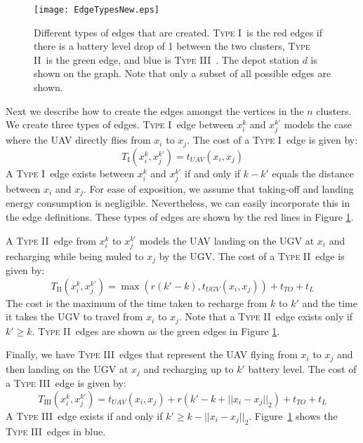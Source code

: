 \documentclass[letterpaper,10pt,conference]{ieeeconf}
\newcommand{\typeone}{\textsc{Type I\ }}
\newcommand{\typetwo}{\textsc{Type II\ }}
\newcommand{\typethree}{\textsc{Type III\ }}
\begin{document}
\begin{figure}[ht]
\centering
\texttt{[image: EdgeTypesNew.eps]}
\caption{Different types of edges that are created. \typeone is the red edges if there is a battery level drop of 1 between the two clusters, \typetwo is the green edge, and blue is \typethree. The depot station $d$ is shown on the graph. Note that only a subset of all possible edges are shown.\label{fig:edgetypes}}
\end{figure}

Next we describe how to create the edges amongst the vertices in the $n$ clusters. We create three types of edges. \typeone edge between $x_i^k$ and $x_j^{k'}$ models the case where the UAV directly flies from $x_i$ to $x_j$. The cost of a \typeone edge is given by:
\begin{equation*}
T_\text{I}(x_i^k,x_j^{k'}) = t_{UAV}(x_i, x_j)
\end{equation*}
A \typeone edge exists between $x_i^k$ and $x_j^{k'}$ if and only if $k-k'$ equals the distance between $x_i$ and $x_j$. For ease of exposition, we assume that taking-off and landing energy consumption is negligible. Nevertheless, we can easily incorporate this in the edge definitions. These types of edges are shown by the red lines in Figure \ref{fig:edgetypes}. 

A \typetwo edge from $x_i^k$ to $x_j^{k'}$ models the UAV landing on the UGV at $x_i$ and recharging while being muled to $x_j$ by the UGV. The cost of a \typetwo edge is given by:
\begin{equation*}
T_\text{II}(x_i^k,x_j^{k'}) = \max(r(k'-k), t_{UGV}(x_i, x_j)) + t_{TO} + t_{L}
\end{equation*}
The cost is the maximum of the time taken to recharge from $k$ to $k'$ and the time it takes the UGV to travel from $x_i$ to $x_j$. Note that a \typetwo edge exists only if $k' \geq k$. \typetwo edges are shown as the green edges in Figure \ref{fig:edgetypes}. 

Finally, we have \typethree edges that represent the UAV flying from $x_i$ to $x_j$ and then landing on the UGV at $x_j$ and recharging up to $k'$ battery level. The cost of a \typethree edge is given by:
\begin{equation*}
T_\text{III}(x_i^k,x_j^{k'}) = t_{UAV}(x_i, x_j) + r(k' - k + ||x_i-x_j||_2) + t_{TO} + t_{L}
\end{equation*}
A \typethree edge exists if and only if $k' \geq k - ||x_i-x_j||_2$. Figure~\ref{fig:edgetypes} shows the \typethree edges in blue. 
\end{document}

